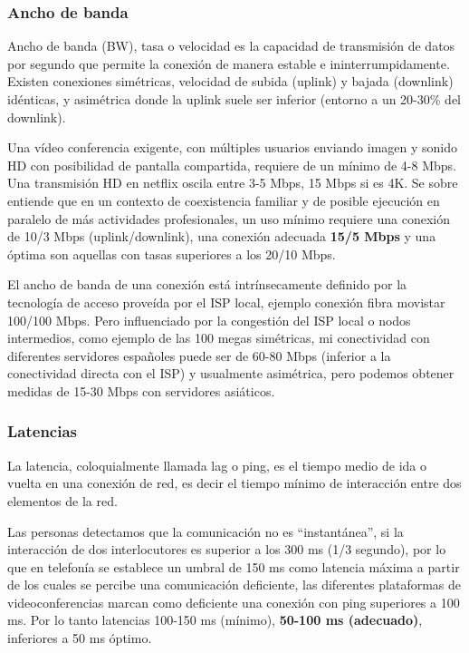 \subsubsection{Ancho de banda}
Ancho de banda (BW), tasa o velocidad es la capacidad de transmisión de datos por segundo que permite la conexión de manera estable e ininterrumpidamente. Existen conexiones simétricas, velocidad de subida (uplink) y bajada (downlink) idénticas, y asimétrica donde la uplink suele ser inferior (entorno a un 20-30\% del downlink).

Una vídeo conferencia exigente, con múltiples usuarios enviando imagen y sonido HD con posibilidad de pantalla compartida, requiere de un mínimo de 4-8 Mbps. Una transmisión HD en netflix oscila entre 3-5 Mbps, 15 Mbps si es 4K. Se sobre entiende que en un contexto de coexistencia familiar y de posible ejecución en paralelo de más actividades profesionales, un uso mínimo  requiere una conexión de 10/3 Mbps (uplink/downlink), una conexión adecuada \textbf{15/5 Mbps} y una óptima son aquellas con tasas superiores a los 20/10 Mbps.

El ancho de banda de una conexión está intrínsecamente definido por la tecnología de acceso proveída por el ISP local, ejemplo conexión fibra movistar 100/100 Mbps. Pero influenciado por la congestión del ISP local o nodos intermedios, como ejemplo de las 100 megas simétricas, mi conectividad con diferentes servidores españoles puede ser de 60-80 Mbps (inferior a la conectividad directa con el ISP) y usualmente asimétrica, pero podemos obtener medidas de 15-30 Mbps con servidores asiáticos.

\subsubsection{Latencias}
La latencia, coloquialmente llamada lag o ping, es el tiempo medio de ida o vuelta en una conexión de red, es decir el tiempo mínimo de interacción entre dos elementos de la red. 

Las personas detectamos que la comunicación no es “instantánea”, si la interacción de dos interlocutores es superior a los 300 ms (1/3 segundo), por lo que en telefonía se establece un umbral de 150 ms como latencia máxima a partir de los cuales se percibe una comunicación deficiente, las diferentes plataformas de videoconferencias marcan como deficiente una conexión con ping superiores a 100 ms. Por lo tanto latencias 100-150 ms (mínimo), \textbf{50-100 ms (adecuado)}, inferiores a 50 ms óptimo.

